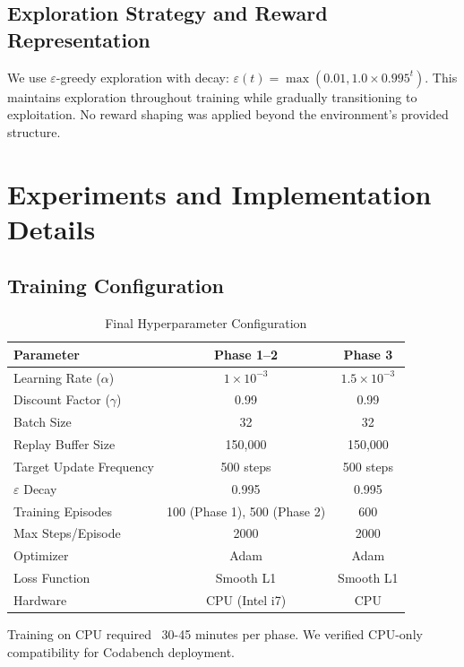 \documentclass[12pt,a4paper]{article}
\begin{document}
\subsection{Exploration Strategy and Reward Representation}

We use $\varepsilon$-greedy exploration with decay: $\varepsilon(t) = \max(0.01, 1.0 \times 0.995^t)$. This maintains exploration throughout training while gradually transitioning to exploitation. No reward shaping was applied beyond the environment's provided structure.

\section{Experiments and Implementation Details}

\subsection{Training Configuration}

\begin{table}[H]
\centering
\caption{Final Hyperparameter Configuration}
\begin{tabular}{|l|c|c|}
\hline
\textbf{Parameter} & \textbf{Phase 1--2} & \textbf{Phase 3} \\
\hline
Learning Rate ($\alpha$) & $1 \times 10^{-3}$ & $1.5 \times 10^{-3}$ \\
\hline
Discount Factor ($\gamma$) & 0.99 & 0.99 \\
\hline
Batch Size & 32 & 32 \\
\hline
Replay Buffer Size & 150,000 & 150,000 \\
\hline
Target Update Frequency & 500 steps & 500 steps \\
\hline
$\varepsilon$ Decay & 0.995 & 0.995 \\
\hline
Training Episodes & 100 (Phase 1), 500 (Phase 2) & 600 \\
\hline
Max Steps/Episode & 2000 & 2000 \\
\hline
Optimizer & Adam & Adam \\
\hline
Loss Function & Smooth L1 & Smooth L1 \\
\hline
Hardware & CPU (Intel i7) & CPU \\
\hline
\end{tabular}
\end{table}

Training on CPU required ~30-45 minutes per phase. We verified CPU-only compatibility for Codabench deployment.
\end{document}
